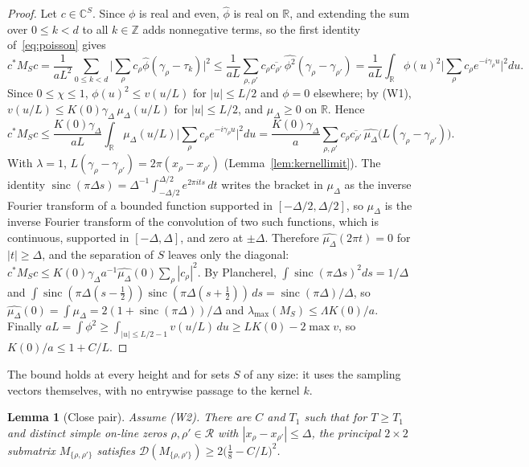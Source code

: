 \documentclass[11pt]{article}
\newtheorem{lemma}[theorem]{Lemma}
\theoremstyle{definition}
\newcommand{\R}{\mathbb{R}}
\newcommand{\Z}{\mathbb{Z}}
\newcommand{\cR}{\mathcal{R}}
\begin{document}
\begin{proof}
Let $c\in\mathbb C^S$. Since $\phi$ is real and even, $\widehat\phi$ is real on
$\R$, and extending the sum over $0\le k<d$ to all $k\in\Z$ adds nonnegative
terms, so the first identity of~\eqref{eq:poisson} gives
\[
  c^*M_Sc=\frac1{aL^2}\sum_{0\le k<d}\Big|\sum_\rho c_\rho\widehat\phi(\gamma_\rho-\tau_k)\Big|^2
  \le\frac1{aL}\sum_{\rho,\rho'}c_\rho\overline{c_{\rho'}}\,\widehat{\phi^2}(\gamma_\rho-\gamma_{\rho'})
  =\frac1{aL}\int_\R\phi(u)^2\Big|\sum_\rho c_\rho e^{-i\gamma_\rho u}\Big|^2du .
\]
Since $0\le\chi\le1$, $\phi(u)^2\le v(u/L)$ for $|u|\le L/2$ and $\phi=0$
elsewhere; by (W1), $v(u/L)\le K(0)\gamma_\Delta\,\mu_\Delta(u/L)$ for
$|u|\le L/2$, and $\mu_\Delta\ge0$ on $\R$. Hence
\[
  c^*M_Sc\le\frac{K(0)\gamma_\Delta}{aL}\int_\R\mu_\Delta(u/L)
     \Big|\sum_\rho c_\rho e^{-i\gamma_\rho u}\Big|^2du
  =\frac{K(0)\gamma_\Delta}{a}\sum_{\rho,\rho'}c_\rho\overline{c_{\rho'}}\,
     \widehat{\mu_\Delta}\big(L(\gamma_\rho-\gamma_{\rho'})\big).
\]
With $\lambda=1$, $L(\gamma_\rho-\gamma_{\rho'})=2\pi(x_\rho-x_{\rho'})$
(Lemma~\ref{lem:kernellimit}). The identity
$\operatorname{sinc}(\pi\Delta s)=\Delta^{-1}\int_{-\Delta/2}^{\Delta/2}e^{2\pi its}\,dt$
writes the bracket in $\mu_\Delta$ as the inverse Fourier transform of a
bounded function supported in $[-\Delta/2,\Delta/2]$, so $\mu_\Delta$ is the
inverse Fourier transform of the convolution of two such functions, which is
continuous, supported in $[-\Delta,\Delta]$, and zero at $\pm\Delta$.
Therefore $\widehat{\mu_\Delta}(2\pi t)=0$ for $|t|\ge\Delta$, and the
separation of $S$ leaves only the diagonal:
$c^*M_Sc\le K(0)\gamma_\Delta a^{-1}\widehat{\mu_\Delta}(0)\sum_\rho|c_\rho|^2$.
By Plancherel, $\int\operatorname{sinc}(\pi\Delta s)^2ds=1/\Delta$ and
$\int\operatorname{sinc}(\pi\Delta(s-\tfrac12))\operatorname{sinc}(\pi\Delta(s+\tfrac12))\,ds
=\operatorname{sinc}(\pi\Delta)/\Delta$, so
$\widehat{\mu_\Delta}(0)=\int\mu_\Delta=2(1+\operatorname{sinc}(\pi\Delta))/\Delta$
and $\lambda_{\max}(M_S)\le\Lambda K(0)/a$. Finally
$aL=\int\phi^2\ge\int_{|u|\le L/2-1}v(u/L)\,du\ge LK(0)-2\max v$, so
$K(0)/a\le1+C/L$.
\end{proof}

The bound holds at every height and for sets $S$ of any size: it uses the
sampling vectors themselves, with no entrywise passage to the kernel $k$.

\begin{lemma}[Close pair]\label{lem:closepair}
Assume (W2). There are $C$ and $T_1$ such that for $T\ge T_1$ and distinct
simple on-line zeros $\rho,\rho'\in\cR$ with $|x_\rho-x_{\rho'}|\le\Delta$,
the principal $2\times2$ submatrix $M_{\{\rho,\rho'\}}$ satisfies
$\mathcal D(M_{\{\rho,\rho'\}})\ge2\big(\tfrac18-C/L\big)^2$.
\end{lemma}
\end{document}
